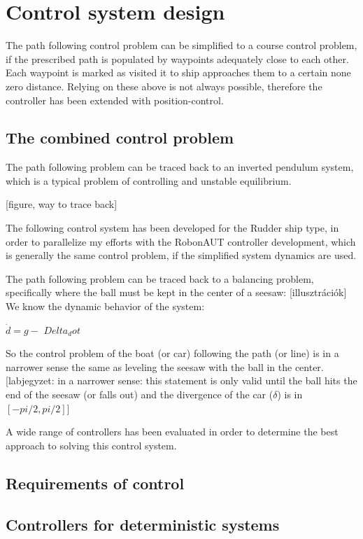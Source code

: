 \section{Control system design}


The path following control problem can be simplified to a course control problem, if the prescribed path is populated by waypoints adequately close to each other. Each waypoint is marked as visited it to ship approaches them to a certain none zero distance. Relying on these above is not always possible, therefore the controller has been extended with position-control.

\subsection{The combined control problem}

The path following problem can be traced back to an inverted pendulum system, which is a typical problem of controlling and unstable equilibrium. 

[figure, way to trace back]

The following control system has been developed for the Rudder ship type, in order to parallelize my efforts with the RobonAUT controller development, which is generally the same control problem, if the simplified system dynamics are used.

The path following problem can be traced back to a balancing problem, specifically where the ball must be kept in the center of a seesaw: [illusztrációk]
We know the dynamic behavior of the system:

$\dot{d} = g-$
$Delta_dot$

So the control problem of the boat (or car) following the path (or line) is in a narrower sense the same as leveling the seesaw with the ball in the center. [labjegyzet: in a narrower sense: this statement is only valid until the ball hits the end of the seesaw (or falls out) and the divergence of the car ($\delta$) is in $[-pi/2, pi/2]$]

A wide range of controllers has been evaluated in order to determine the best approach to solving this control system.

\subsection{Requirements of control}

\subsection{Controllers for deterministic systems}

